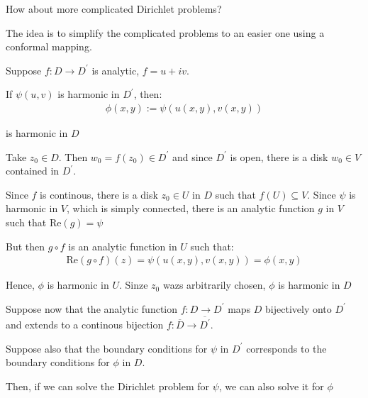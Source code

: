 \par\bigskip
\noindent How about more complicated Dirichlet problems?\par
\noindent The idea is to simplify the complicated problems to an easier one using a conformal mapping.
\par\bigskip
\begin{theo}[]{}
  Suppose $f:D\to D^{\prime}$ is analytic, $f = u+iv$.\par
  \noindent If $\psi(u,v)$ is harmonic in $D^{\prime}$, then:
  \begin{equation*}
    \begin{gathered}
      \phi(x,y):= \psi(u(x,y),v(x,y))
    \end{gathered}
  \end{equation*}\par
  \noindent is harmonic in $D$
\end{theo}
\par\bigskip
\begin{prf}[]{}
  Take $z_0\in D$. Then $w_0 = f(z_0)\in D^{\prime}$ and since $D^{\prime}$  is open, there is a disk $w_0\in V$  contained in $D^{\prime}$.
  \par\bigskip
  \noindent Since $f$ is continous, there is a disk $z_0\in U$ in $D$ such that $f(U)\subseteq V$. Since $\psi$ is harmonic in $V$, which is simply connected, there is an analytic function $g$  in $V$  such that $\text{Re}(g) = \psi$
  \par\bigskip
  \noindent But then $g\circ f$ is an analytic function in $U$ such that:
  \begin{equation*}
    \begin{gathered}
      \text{Re}(g\circ f)(z) = \psi(u(x,y),v(x,y)) = \phi(x,y)
    \end{gathered}
  \end{equation*}
  \par\bigskip
  \noindent Hence, $\phi$ is harmonic in $U$. Sinze $z_0$ wazs arbitrarily chosen, $\phi$ is harmonic in $D$
\end{prf}
\par\bigskip
\noindent Suppose now that the analytic function $f:D\to D^{\prime}$ maps $D$ bijectively onto $D^{\prime}$ and extends to a continous bijection $f:\overline{D}\to \overline{D^{\prime}}$.\par
\noindent Suppose also that the boundary conditions for $\psi$ in $D^{\prime}$ corresponds to the boundary conditions for $\phi$ in $D$.
\par\bigskip
\noindent Then, if we can solve the Dirichlet problem for $\psi$, we can also solve it for $\phi$
